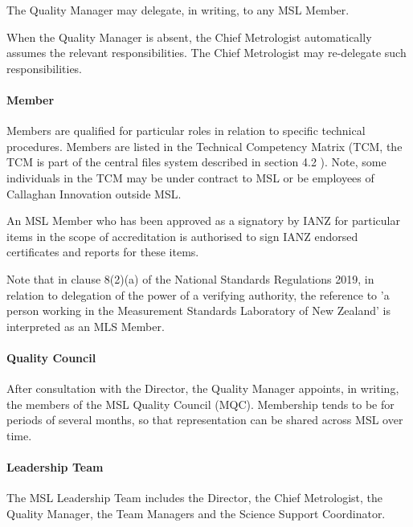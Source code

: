 The Quality Manager may delegate, in writing, to any MSL Member.

When the Quality Manager is absent, the Chief Metrologist automatically assumes the relevant responsibilities.  The Chief Metrologist may re-delegate such responsibilities. 
%
\paragraph{Member}
Members are qualified for particular roles in relation to specific technical procedures. Members are listed in the Technical Competency Matrix (TCM, the TCM is part of the central files system described in section 4.2 ). Note, some individuals in the TCM may be under contract to MSL or be employees of Callaghan Innovation outside MSL. 

An MSL Member who has been approved as a signatory by IANZ for particular items in the scope of accreditation is authorised to sign IANZ endorsed certificates and reports for these items.


{Note that in clause 8(2)(a) of the National Standards Regulations 2019, in relation to delegation of the power of a verifying authority, the reference to 'a person working in the Measurement Standards Laboratory of New Zealand' is interpreted as an MLS Member.}

\paragraph{Quality Council}
After consultation with the Director, the Quality Manager appoints, in writing, the members of the MSL Quality Council (MQC). Membership tends to be for periods of several months, so that representation can be shared across MSL over time.

\paragraph{Leadership Team}
The MSL Leadership Team includes the Director, the Chief Metrologist, the Quality Manager, the 
Team Managers and the Science Support Coordinator. 

